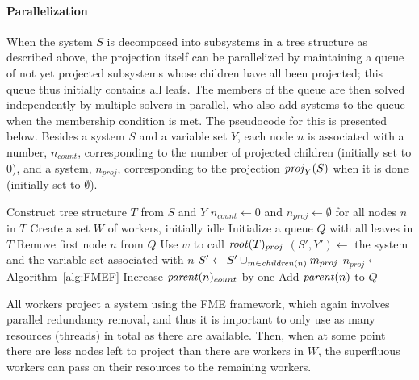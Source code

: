 \paragraph{Parallelization}
When the system $S$ is decomposed into subsystems in a tree structure as described above, the projection itself can be parallelized by maintaining a queue of not yet projected subsystems whose children have all been projected; this queue thus initially contains all leafs. 
The members of the queue are then solved independently by multiple solvers in parallel, who also add systems to the queue when the membership condition is met.
The pseudocode for this is presented below. Besides a system $S$ and a variable set $Y$, each node $n$ is associated with a number, $n_{count}$, corresponding to the number of projected children (initially set to $0$), and a system, $n_{proj}$, corresponding to the projection $\mathit{proj}_Y(S)$ when it is done (initially set to $\emptyset$). 
\vspace{1mm}
\begin{algorithmic}
	\State Construct  tree structure $T$ from $S$ and $Y$
	\State $n_{count}\gets 0$ and $n_{proj}\gets\emptyset$ for all nodes $n$ in $T$
	\State Create a set $W$ of workers, initially idle
	\State Initialize a queue $Q$ with all leaves in $T$
			\State Remove first node $n$ from $Q$
			\State Use $w$ to call 
		\EndIf
	\EndWhile
	\State \Return $\mathit{root}(T)_{proj}$
\EndFunction
\Statex
{}
	\State $(S',Y')\gets$ the system and the variable set associated with $n$
	\State $S'\gets S'\cup_{m\in \mathit{children}(n)} m_{proj}$ 
	\State $n_{proj}\gets$  \Comment Algorithm~\ref{alg:FMEF}
	\State Increase $\mathit{parent}(n)_{count}$ by one
		\State Add $\mathit{parent}(n)$ to $Q$
	\EndIf
	\State \Return
\EndFunction
\end{algorithmic}	
\vspace{1mm}
All workers project a system using the FME framework, which again involves parallel redundancy removal, and thus it is important to only use as many resources (threads) in total as there are available.
Then, when at some point there are less nodes left to project than there are workers in $W$, the superfluous workers can pass on their resources to the remaining workers.  
%